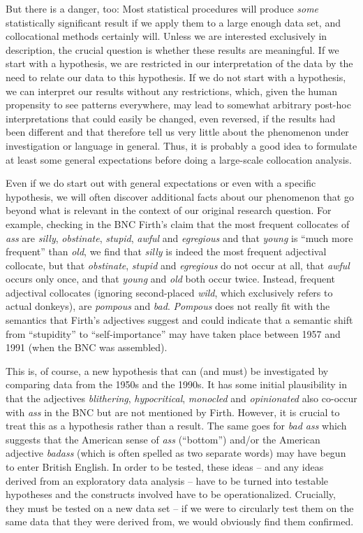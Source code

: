 But there is a danger, too: Most statistical procedures will produce \textit{some} statistically significant result if we apply them to a large enough data set, and collocational methods certainly will. Unless we are interested exclusively in description, the crucial question is whether these results are meaningful. If we start with a hypothesis, we are restricted in our interpretation of the data by the need to relate our data to this hypothesis. If we do not start with a hypothesis, we can interpret our results without any restrictions, which, given the human propensity to see patterns everywhere, may lead to somewhat arbitrary post-hoc interpretations that could easily be changed, even reversed, if the results had been different and that therefore tell us very little about the phenomenon under investigation or language in general. Thus, it is probably a good idea to formulate at least some general expectations before doing a large-scale collocation analysis. 

Even if we do start out with general expectations or even with a specific hypothesis, we will often discover additional facts about our phenomenon that go beyond what is relevant in the context of our original research question. For example, checking in the BNC Firth's claim that the most frequent collocates of \textit{ass} are \textit{silly}, \textit{obstinate}, \textit{stupid}, \textit{awful} and \textit{egregious} and that \textit{young} is ``much more frequent'' than \textit{old}, we find that \textit{silly} is indeed the most frequent adjectival collocate, but that \textit{obstinate}, \textit{stupid} and \textit{egregious} do not occur at all, that \textit{awful} occurs only once, and that \textit{young} and \textit{old} both occur twice. Instead, frequent adjectival collocates (ignoring second-placed \textit{wild}, which exclusively refers to actual donkeys), are \textit{pompous} and \textit{bad}. \textit{Pompous} does not really fit with the semantics that Firth's adjectives suggest and could indicate that a semantic shift from ``stupidity'' to ``self-importance'' may have taken place between 1957 and 1991 (when the BNC was assembled).

This is, of course, a new hypothesis that can (and must) be investigated by comparing data from the 1950s and the 1990s. It has some initial plausibility in that the adjectives \textit{blithering}, \textit{hypocritical}, \textit{monocled} and \textit{opinionated} also co-occur with \textit{ass} in the BNC but are not mentioned by Firth. However, it is crucial to treat this as a hypothesis rather than a result. The same goes for \textit{bad ass} which suggests that the American sense of \textit{ass} (``bottom'') and/or the American adjective \textit{badass} (which is often spelled as two separate words) may have begun to enter British English. In order to be tested, these ideas -- and any ideas derived from an exploratory data analysis -- have to be turned into testable hypotheses and the constructs involved have to be operationalized. Crucially, they must be tested on a new data set -- if we were to circularly test them on the same data that they were derived from, we would obviously find them confirmed.

